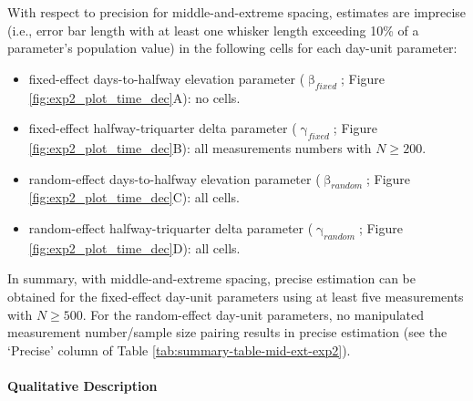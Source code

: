 \documentclass[
12pt, %
twoside,
english]{guelphthesis}
\begin{document}
With respect to precision for middle-and-extreme spacing, estimates are imprecise (i.e., error bar length with at least one whisker length exceeding 10\% of a parameter's population value) in the following cells for each day-unit parameter:
\begin{itemize}
\tightlist
\item
  fixed-effect days-to-halfway elevation parameter (\(\upbeta_{fixed}\); Figure \ref{fig:exp2_plot_time_dec}A): no cells.
\item
  fixed-effect halfway-triquarter delta parameter (\(\upgamma_{fixed}\); Figure \ref{fig:exp2_plot_time_dec}B): all measurements numbers with \(N \ge 200\).
\item
  random-effect days-to-halfway elevation parameter (\(\upbeta_{random}\); Figure \ref{fig:exp2_plot_time_dec}C): all cells.
\item
  random-effect halfway-triquarter delta parameter (\(\upgamma_{random}\); Figure \ref{fig:exp2_plot_time_dec}D): all cells.
\end{itemize}
In summary, with middle-and-extreme spacing, precise estimation can be obtained for the fixed-effect day-unit parameters using at least five measurements with \(N \ge 500\). For the random-effect day-unit parameters, no manipulated measurement number/sample size pairing results in precise estimation (see the `Precise' column of Table \ref{tab:summary-table-mid-ext-exp2}).

\hypertarget{qualitative-mid-ext-exp2}{%
\paragraph{Qualitative Description}\label{qualitative-mid-ext-exp2}}
\end{document}
